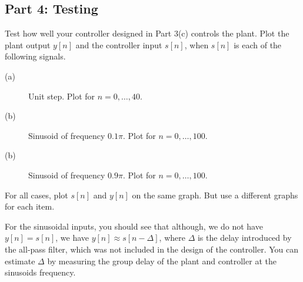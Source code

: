 \documentclass[12pt]{report}
\begin{document}
\subsection*{Part 4: Testing}
Test how well your controller designed in Part 3(c) controls the plant. Plot the plant output $y[n]$ and the controller input $s[n]$, when $s[n]$ is each of the following signals.

\begin{description}
	\item[(a)] Unit step. Plot for $n = 0, \ldots, 40$.
	\item[(b)] Sinusoid of frequency $0.1\pi$. Plot for $n = 0, \ldots, 100$.
	\item[(b)] Sinusoid of frequency $0.9\pi$. Plot for $n = 0, \ldots, 100$.
\end{description}

For all cases, plot $s[n]$ and $y[n]$ on the same graph. But use a different graphs for each item. 

For the sinusoidal inputs, you should see that although, we do not have $y[n] = s[n]$, we have $y[n] \approx s[n-\Delta]$, where $\Delta$ is the delay introduced by the all-pass filter, which was not included in the design of the controller. You can estimate $\Delta$ by measuring the group delay of the plant and controller at the sinusoids frequency.
\end{document}
